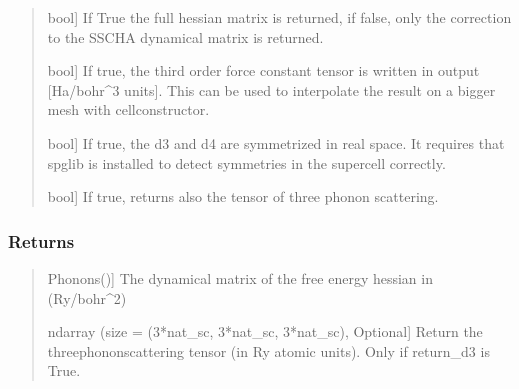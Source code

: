 \documentclass[a4paper,11pt,english]{sphinxmanual}
\begin{document}
\begin{fulllineitems}
\begin{fulllineitems}
\begin{quote}
\begin{description}
\sphinxlineitem{get\_full\_hessian}{[}bool{]}
\sphinxAtStartPar
If True the full hessian matrix is returned, if false, only the correction to
the SSCHA dynamical matrix is returned.

\sphinxlineitem{verbose}{[}bool{]}
\sphinxAtStartPar
If true, the third order force constant tensor is written in output {[}Ha/bohr\textasciicircum{}3 units{]}.
This can be used to interpolate the result on a bigger mesh with cellconstructor.

\sphinxlineitem{use\_symmetries}{[}bool{]}
\sphinxAtStartPar
If true, the d3 and d4 are symmetrized in real space.
It requires that spglib is installed to detect symmetries in the supercell correctly.

\sphinxlineitem{return\_d3}{[}bool{]}
\sphinxAtStartPar
If true, returns also the tensor of three phonon scattering.

\end{description}
\end{quote}


\subsubsection{Returns}
\label{\detokenize{apireference:id9}}\begin{quote}
\begin{description}
\sphinxlineitem{phi\_sc}{[}Phonons(){]}
\sphinxAtStartPar
The dynamical matrix of the free energy hessian in (Ry/bohr\textasciicircum{}2)

\sphinxlineitem{d3}{[}ndarray (size = (3*nat\_sc, 3*nat\_sc, 3*nat\_sc), Optional{]}
\sphinxAtStartPar
Return the three\sphinxhyphen{}phonon\sphinxhyphen{}scattering tensor (in Ry atomic units).
Only if return\_d3 is True.

\end{description}
\end{quote}

\end{fulllineitems}


\begin{fulllineitems}
\label{\detokenize{apireference:sscha.Ensemble.Ensemble.get_free_energy_interpolating}}
\pysigstartsignatures
{}
\pysigstopsignatures


\end{fulllineitems}
\end{fulllineitems}
\end{document}
